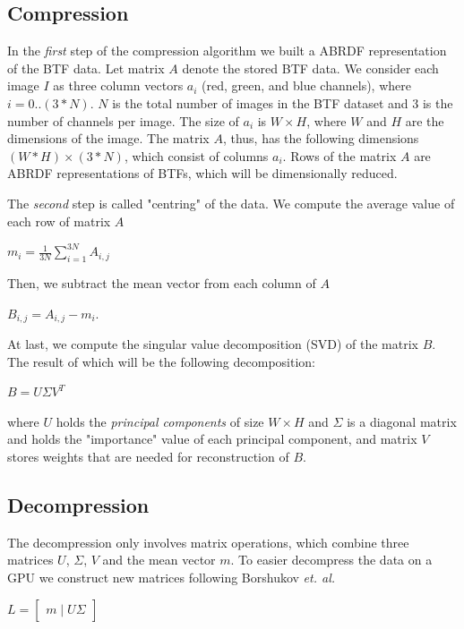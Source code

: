 \subsection{Compression}
\label{section:compression}
In the \emph{first} step of the compression algorithm we built a ABRDF representation of the BTF data.
Let matrix $A$ denote the stored BTF data.
We consider each image $I$ as three column vectors $a_{i}$ (red, green, and blue channels), where $i=0..(3*N)$. $N$ is the total number of images in the BTF dataset and 3 is the number of channels per image.
The size of $a_{i}$ is $W\times H$, where $W$ and $H$ are the dimensions of the image.
The matrix $A$, thus, has the following dimensions $(W*H)\times(3*N)$, which consist of columns $a_{i}$.
Rows of the matrix $A$ are ABRDF representations of BTFs, which will be dimensionally reduced.

The  \emph{second} step is called "centring" of the data. We compute the average value of each row of matrix $A$

{\centering $m_i=\frac{1}{3N}\sum_{i=1}^{3N}A_{i,j}$ \\}

Then, we subtract the mean vector from each column of $A$

{\centering $B_{i,j}=A_{i,j}-m_i.$ \\}

At last, we compute the singular value decomposition (SVD) of the matrix $B$. The result of which will be the following decomposition:

{\centering $B=U\Sigma V^{T}$ \\}

where $U$ holds the \emph{principal components} of size $W\times H$ and $\Sigma$ is a diagonal matrix and holds the "importance" value of each principal component, and
matrix $V$ stores weights that are needed for reconstruction of $B$.

\subsection{Decompression}
\label{section:decompression}
The decompression only involves matrix operations, which  combine three matrices $U$, $\Sigma$, $V$ and the mean vector $m$.
To easier decompress the data on a GPU we construct new matrices following Borshukov  \emph{et. al.} \cite[Ch.\ 15]{gpu_gems}

{\centering $L=\begin{bmatrix}
 m\mid U \Sigma
\end{bmatrix}$ \\}

